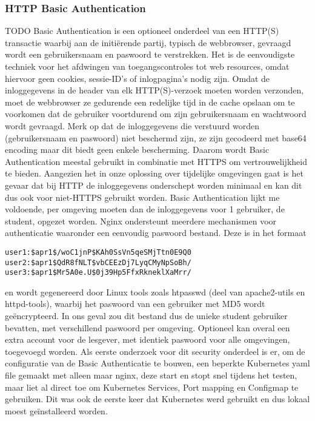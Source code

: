 \subsubsection{HTTP Basic Authentication}
TODO \autocite{Wikipedia2023b}
Basic Authentication is een optioneel onderdeel van een HTTP(S) transactie waarbij aan de initiërende partij, typisch de webbrowser, gevraagd wordt een gebruikersnaam en paswoord te verstrekken. Het is de eenvoudigste techniek voor het afdwingen van toegangscontroles tot web resources, omdat hiervoor geen cookies, sessie-ID's of inlogpagina's nodig zijn.
Omdat de inloggegevens in de header van elk HTTP(S)-verzoek moeten worden verzonden, moet de webbrowser ze gedurende een redelijke tijd in de cache opslaan om te voorkomen dat de gebruiker voortdurend om zijn gebruikersnaam en wachtwoord wordt gevraagd.
Merk op dat de inloggegevens die verstuurd worden (gebruikersnaam en paswoord) niet beschermd zijn, ze zijn gecodeerd met base64 encoding maar dit biedt geen enkele bescherming. Daarom wordt Basic Authentication meestal gebruikt in combinatie met HTTPS om vertrouwelijkheid te bieden. Aangezien het in onze oplossing over tijdelijke omgevingen gaat is het gevaar dat bij HTTP de inloggegevens onderschept worden minimaal en kan dit dus ook voor niet-HTTPS gebruikt worden.
\newline
\newline
Basic Authentication lijkt me voldoende, per omgeving moeten dan de inloggegevens voor 1 gebruiker, de student, opgezet worden. Nginx ondersteunt meerdere mechanismen voor authenticatie waaronder een eenvoudig paswoord bestand. Deze is in het formaat
\newline
\newline
\begin{lstlisting}
user1:$apr1$/woC1jnP$KAh0SsVn5qeSMjTtn0E9Q0
user2:$apr1$QdR8fNLT$vbCEEzDj7LyqCMyNpSoBh/
user3:$apr1$Mr5A0e.U$0j39Hp5FfxRkneklXaMrr/ 
\end{lstlisting}


en wordt gegenereerd door Linux tools zoals htpasswd (deel van apache2-utils en httpd-tools), waarbij het paswoord van een gebruiker met MD5 wordt geëncrypteerd. In ons geval zou dit bestand dus de unieke student gebruiker bevatten, met verschillend paswoord per omgeving.
Optioneel kan overal een extra account voor de lesgever, met identiek paswoord voor alle omgevingen, toegevoegd worden.
\newline
\newline
Als eerste onderzoek voor dit security onderdeel is er, om de configuratie van de Basic Authenticatie te bouwen, een beperkte Kubernetes yaml file gemaakt met alleen maar nginx, deze start en stopt snel tijdens het testen, maar liet al direct toe om Kubernetes Services, Port mapping en Configmap te gebruiken. Dit was ook de eerste keer dat Kubernetes werd gebruikt en dus lokaal moest geïnstalleerd worden.
\newline
\newline
